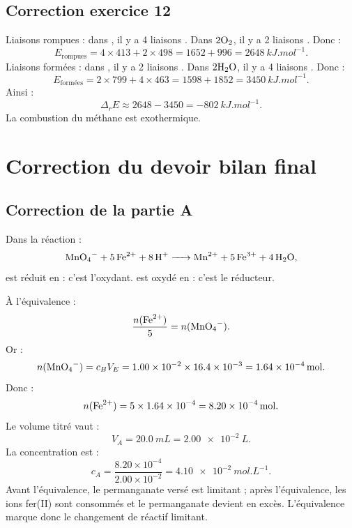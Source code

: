 \documentclass[11pt,a4paper]{article}
\begin{document}
\subsection*{Correction exercice 12}
\begin{correctionbox}
Liaisons rompues : dans , il y a 4 liaisons . Dans $2\ce{O2}$, il y a 2 liaisons . Donc :
\[
E_{\text{rompues}}=4\times413+2\times498=1652+996=\SI{2648}{kJ.mol^{-1}}.
\]
Liaisons formées : dans , il y a 2 liaisons . Dans $2\ce{H2O}$, il y a 4 liaisons . Donc :
\[
E_{\text{formées}}=2\times799+4\times463=1598+1852=\SI{3450}{kJ.mol^{-1}}.
\]
Ainsi :
\[
\Delta_rE\approx2648-3450=\SI{-802}{kJ.mol^{-1}}.
\]
La combustion du méthane est exothermique.
\end{correctionbox}

\newpage

\section{Correction du devoir bilan final}

\subsection*{Correction de la partie A}
\begin{correctionbox}
Dans la réaction :
\[
\ce{MnO4^- + 5Fe^{2+} + 8H+ -> Mn^{2+} + 5Fe^{3+} + 4H2O},
\]
 est réduit en  : c'est l'oxydant.  est oxydé en  : c'est le réducteur.

À l'équivalence :
\[
\frac{n(\ce{Fe^{2+}})}{5}=n(\ce{MnO4^-}).
\]
Or :
\[
n(\ce{MnO4^-})=c_BV_E=1.00\times10^{-2}\times16.4\times10^{-3}=\SI{1.64e-4}{mol}.
\]
Donc :
\[
n(\ce{Fe^{2+}})=5\times1.64\times10^{-4}=\SI{8.20e-4}{mol}.
\]
Le volume titré vaut :
\[
V_A=\SI{20.0}{mL}=\SI{2.00e-2}{L}.
\]
La concentration est :
\[
c_A=\frac{8.20\times10^{-4}}{2.00\times10^{-2}}=\SI{4.10e-2}{mol.L^{-1}}.
\]
Avant l'équivalence, le permanganate versé est limitant ; après l'équivalence, les ions fer(II) sont consommés et le permanganate devient en excès. L'équivalence marque donc le changement de réactif limitant.
\end{correctionbox}
\end{document}
